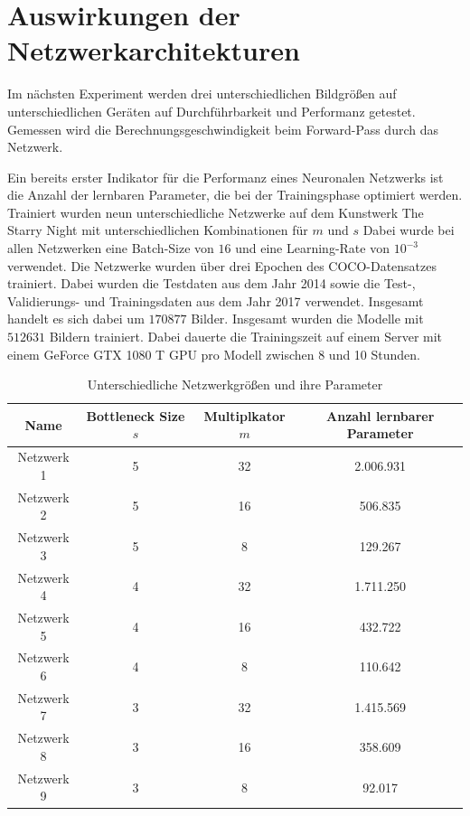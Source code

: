 \section{Auswirkungen der Netzwerkarchitekturen}

Im nächsten Experiment werden drei unterschiedlichen Bildgrößen auf unterschiedlichen Geräten auf Durchführbarkeit und Performanz getestet.
Gemessen wird die Berechnungsgeschwindigkeit beim Forward-Pass durch das Netzwerk. 

Ein bereits erster Indikator für die Performanz eines Neuronalen Netzwerks ist die Anzahl der lernbaren Parameter, die bei der Trainingsphase optimiert werden. Trainiert wurden neun unterschiedliche Netzwerke auf dem Kunstwerk The Starry Night mit unterschiedlichen Kombinationen für $ m $ und $ s $
Dabei wurde bei allen Netzwerken eine Batch-Size von $ 16 $ und eine Learning-Rate von $ 10^{-3} $ verwendet. Die Netzwerke wurden über drei Epochen des COCO-Datensatzes trainiert. Dabei wurden die Testdaten aus dem Jahr 2014 sowie die Test-, Validierungs- und Trainingsdaten aus dem Jahr 2017 verwendet. Insgesamt handelt es sich dabei um $ 170877 $ Bilder. Insgesamt wurden die Modelle mit $ 512631 $ Bildern trainiert. Dabei dauerte die Trainingszeit auf einem Server mit einem GeForce GTX 1080 T GPU pro Modell zwischen 8 und 10 Stunden.

\begin{table}[H]
    \centering
    \begin{tabular}{ |c|c|c|c| }
        \hline
        \textbf{Name} & \textbf{Bottleneck Size $ s $} & \textbf{Multiplkator $ m $} & \textbf{Anzahl lernbarer Parameter} \\ \hline
        Netzwerk 1 & 5 & 32 & 2.006.931 \\ \hline
        Netzwerk 2 & 5 & 16 & 506.835 \\ \hline
        Netzwerk 3 & 5 & 8  & 129.267 \\ \hline

        Netzwerk 4 & 4 & 32 & 1.711.250 \\ \hline
        Netzwerk 5 & 4 & 16 & 432.722 \\ \hline
        Netzwerk 6 & 4 & 8  & 110.642 \\ \hline

        Netzwerk 7 & 3 & 32 & 1.415.569 \\ \hline
        Netzwerk 8 & 3 & 16 & 358.609 \\ \hline
        Netzwerk 9 & 3 & 8  & 92.017 \\ \hline
    \end{tabular}
    \caption{Unterschiedliche Netzwerkgrößen und ihre Parameter}
    \label{tab:networks}
\end{table}

